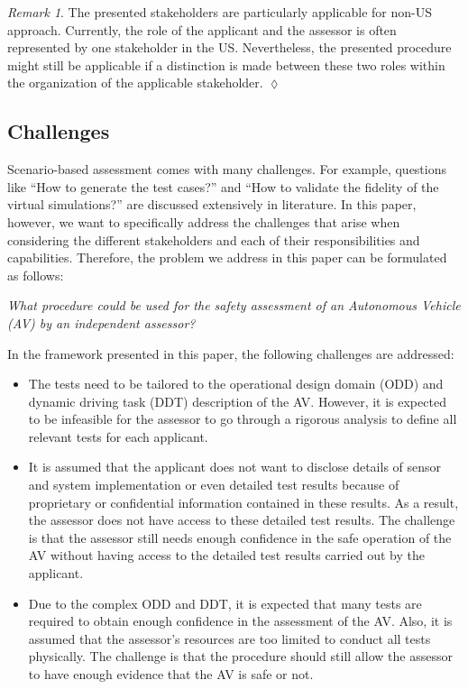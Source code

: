 \documentclass[twoside,twocolumn,9pt]{article}
\theoremstyle{plain}
\theoremstyle{remark}\newtheorem{remarkenv}{Remark}        %
\newenvironment{remark}{\begin{remarkenv}}%
	{\hfill$\lozenge$\end{remarkenv}}            %
\begin{document}
\begin{remark}
	The presented stakeholders are particularly applicable for non-US approach. Currently, the role of the applicant and the assessor is often represented by one stakeholder in the US. Nevertheless, the presented procedure might still be applicable if a distinction is made between these two roles within the organization of the applicable stakeholder.
\end{remark}



\subsection{Challenges}
\label{sec:challenges}

Scenario-based assessment comes with many challenges. For example, questions like ``How to generate the test cases?'' and ``How to validate the fidelity of the virtual simulations?'' are discussed extensively in literature. In this paper, however, we want to specifically address the challenges that arise when considering the different stakeholders and each of their responsibilities and capabilities. Therefore, the problem we address in this paper can be formulated as follows:

\emph{What procedure could be used for the safety assessment of an Autonomous Vehicle (AV) by an independent assessor?}

In the framework presented in this paper, the following challenges are addressed:
\begin{itemize}
	\item The tests need to be tailored to the operational design domain (ODD) and dynamic driving task (DDT) description of the AV. However, it is expected to be infeasible for the assessor to go through a rigorous analysis to define all relevant tests for each applicant.
	\item It is assumed that the applicant does not want to disclose details of sensor and system implementation or even detailed test results because of proprietary or confidential information contained in these results. As a result, the assessor does not have access to these detailed test results. The challenge is that the assessor still needs enough confidence in the safe operation of the AV without having access to the detailed test results carried out by the applicant.
	\item Due to the complex ODD and DDT, it is expected that many tests are required to obtain enough confidence in the assessment of the AV. Also, it is assumed that the assessor's resources are too limited to conduct all tests physically. The challenge is that the procedure should still allow the assessor to have enough evidence that the AV is safe or not.
\end{itemize}
\end{document}

